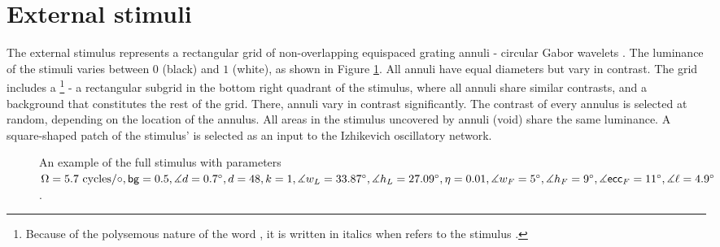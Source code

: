 \section{External stimuli}
\label{sec:external-stimuli}

The external stimulus represents a rectangular grid of non-overlapping equispaced grating annuli - circular Gabor wavelets \cite{MaryamPLACEHOLDER}. The luminance of the stimuli varies between $0$ (black) and $1$ (white), as shown in Figure \ref{fig:full-stimulus-example}. All annuli have equal diameters but vary in contrast. The grid includes a \stimfig{}\footnote{Because of the polysemous nature of the word , it is written in italics when refers to the stimulus \stimfig.} - a rectangular subgrid in the bottom right quadrant of the stimulus, where all annuli share similar contrasts, and a background that constitutes the rest of the grid. There, annuli vary in contrast significantly. The contrast of every annulus is selected at random, depending on the location of the annulus. All areas in the stimulus uncovered by annuli (void) share the same luminance. A square-shaped patch of the stimulus' \stimfig{} is selected as an input to the Izhikevich oscillatory network.

\begin{figure}[!htp]
    \centering
    
    \caption[Full stimulus annotated]{An example of the full stimulus with parameters $ \Omega = 5.7 \text{ cycles}/\circ, \mathsf{bg} = 0.5, \measuredangle d = 0.7^\circ, d = 48, k = 1, \measuredangle w_L = 33.87^\circ, \measuredangle h_L = 27.09^\circ, \eta = 0.01, \measuredangle w_F = 5^\circ, \measuredangle h_F = 9^\circ, \measuredangle \mathsf{ecc}_F = 11^\circ, \measuredangle \ell = 4.9^\circ$.}
    \label{fig:full-stimulus-example}
\end{figure}




